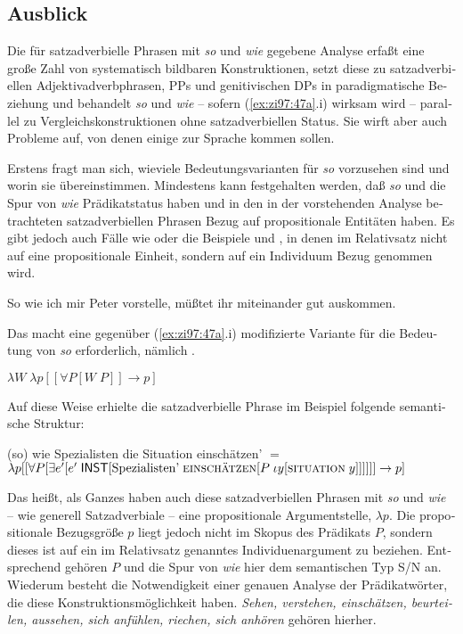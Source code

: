 \documentclass[output=paper, colorlinks, citecolor=brown, booklanguage=german]{langscibook}
\begin{document}
\begin{otherlanguage}{german}
\section{Ausblick} \label{sec:zi97:4}

Die für satzadverbielle Phrasen mit \textit{so} und \textit{wie} gegebene Analyse erfaßt eine große Zahl von systematisch bildbaren Konstruktionen, setzt diese zu satzadverbiellen Adjektivadverbphrasen, PPs und genitivischen DPs in paradigmatische Beziehung und behandelt \textit{so} und \textit{wie} -- sofern (\ref{ex:zi97:47a}.i) wirksam wird -- parallel zu Vergleichskonstruktionen ohne satzadverbiellen Status. Sie wirft aber auch Probleme auf, von denen einige zur Sprache kommen sollen.

Erstens fragt man sich, wieviele Bedeutungsvarianten für \textit{so} vorzusehen sind und worin sie übereinstimmen. Mindestens kann festgehalten werden, daß \textit{so} und die Spur von \textit{wie} Prädikatstatus haben und in den in der vorstehenden Analyse betrachteten satzadverbiellen Phrasen Bezug auf propositionale Entitäten haben. Es gibt jedoch auch Fälle wie  oder die Beispiele  und , in denen im Relativsatz nicht auf eine propositionale Einheit, sondern auf ein Individuum Bezug genommen wird.

\ea \label{ex:zi97:55} So wie ich mir Peter vorstelle, müßtet ihr miteinander gut auskommen.
\z

\noindent Das macht eine gegenüber (\ref{ex:zi97:47a}.i) modifizierte Variante für die Bedeutung von \textit{so} erforderlich, nämlich .

\ea \label{ex:zi97:56} $\lambda W \; \lambda p [[\forall P [W \; P]] \rightarrow p]$
\z

\noindent Auf diese Weise erhielte die satzadverbielle Phrase im Beispiel  folgende semantische Struktur:

\ea (so) wie Spezialisten die Situation einschätzen' $=$ \\
$\lambda p [[\forall P [\exists e' [e' \; \cnst{inst} [\text{Spezialisten'} \; \textsc{einschätzen} %
[P \; \iota y [\textsc{situation} \; y]]]]]] \rightarrow p]$
\z

\noindent Das heißt, als Ganzes haben auch diese satzadverbiellen Phrasen mit \textit{so} und \textit{wie} -- wie generell Satzadverbiale -- eine propositionale Argumentstelle, $\lambda p$. Die propositionale Bezugsgröße $p$ liegt jedoch nicht im Skopus des Prädikats $P$, sondern dieses ist auf ein im Relativsatz genanntes Individuenargument zu beziehen. Entsprechend gehören $P$ und die Spur von \textit{wie} hier dem semantischen Typ S/N an. Wiederum besteht die Notwendigkeit einer genauen Analyse der Prädikatwörter, die diese Konstruktionsmöglichkeit haben. \textit{Sehen, verstehen, einschätzen, beurteilen, aussehen, sich anfühlen, riechen, sich anhören} gehören hierher.


\end{otherlanguage}
\end{document}
